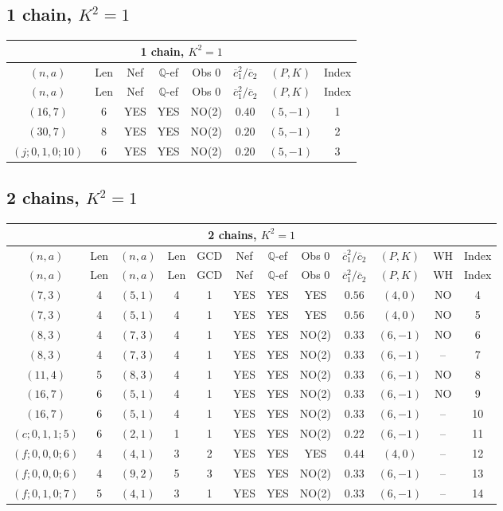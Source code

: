 \subsection{1 chain, $K^2 = 1$}
\begin{longtable}{|c|c|c|c|c|c|c|c|}
\hline
\multicolumn{8}{|c|}{1 chain, $K^2 = 1$}\\
\hline
$(n,a)$ & Len & Nef & $\mathbb Q$-ef & Obs 0 & $\overline c_1^2 / \overline c_2$ & $(P,K)$ & Index\\
\hline
\endfirsthead

\hline
$(n,a)$ & Len & Nef & $\mathbb Q$-ef & Obs 0 & $\overline c_1^2 / \overline c_2$ & $(P,K)$ & Index\\
\hline
\endhead
\hline
\endfoot

$(16,7)$ & 6 & YES & YES & NO(2) & $0.40$ & $(5,-1)$ & 1\\
$(30,7)$ & 8 & YES & YES & NO(2) & $0.20$ & $(5,-1)$ & 2\\
$(j;0,1,0;10)$ & 6 & YES & YES & NO(2) & $0.20$ & $(5,-1)$ & 3
\end{longtable}
\subsection{2 chains, $K^2 = 1$}
\begin{longtable}{|c|c|c|c|c|c|c|c|c|c|c|c|}
\hline
\multicolumn{12}{|c|}{2 chains, $K^2 = 1$}\\
\hline
$(n,a)$ & Len & $(n,a)$ & Len & GCD & Nef & $\mathbb Q$-ef & Obs 0 & $\overline c_1^2 / \overline c_2$ & $(P,K)$ & WH & Index\\
\hline
\endfirsthead

\hline
$(n,a)$ & Len & $(n,a)$ & Len & GCD & Nef & $\mathbb Q$-ef & Obs 0 & $\overline c_1^2 / \overline c_2$ & $(P,K)$ & WH & Index\\
\hline
\endhead
\hline
\endfoot

$(7,3)$ & 4 & $(5,1)$ & 4 & 1 & YES & YES & YES & $0.56$ & $(4,0)$ & NO & 4\\
$(7,3)$ & 4 & $(5,1)$ & 4 & 1 & YES & YES & YES & $0.56$ & $(4,0)$ & NO & 5\\
$(8,3)$ & 4 & $(7,3)$ & 4 & 1 & YES & YES & NO(2) & $0.33$ & $(6,-1)$ & NO & 6\\
$(8,3)$ & 4 & $(7,3)$ & 4 & 1 & YES & YES & NO(2) & $0.33$ & $(6,-1)$ & -- & 7\\
$(11,4)$ & 5 & $(8,3)$ & 4 & 1 & YES & YES & NO(2) & $0.33$ & $(6,-1)$ & NO & 8\\
$(16,7)$ & 6 & $(5,1)$ & 4 & 1 & YES & YES & NO(2) & $0.33$ & $(6,-1)$ & NO & 9\\
$(16,7)$ & 6 & $(5,1)$ & 4 & 1 & YES & YES & NO(2) & $0.33$ & $(6,-1)$ & -- & 10\\
$(c;0,1,1;5)$ & 6 & $(2,1)$ & 1 & 1 & YES & YES & NO(2) & $0.22$ & $(6,-1)$ & -- & 11\\
$(f;0,0,0;6)$ & 4 & $(4,1)$ & 3 & 2 & YES & YES & YES & $0.44$ & $(4,0)$ & -- & 12\\
$(f;0,0,0;6)$ & 4 & $(9,2)$ & 5 & 3 & YES & YES & NO(2) & $0.33$ & $(6,-1)$ & -- & 13\\
$(f;0,1,0;7)$ & 5 & $(4,1)$ & 3 & 1 & YES & YES & NO(2) & $0.33$ & $(6,-1)$ & -- & 14
\end{longtable}
